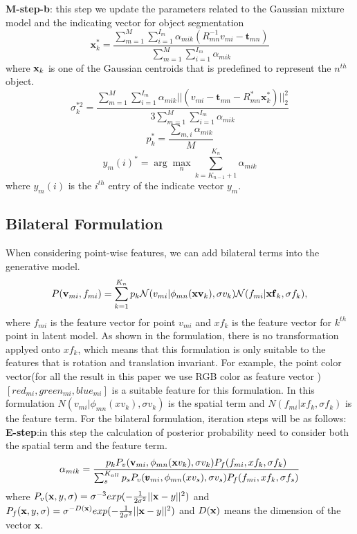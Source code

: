 \textbf{M-step-b}: this step we update the parameters related to the Gaussian mixture model and the indicating vector for object segmentation 
\begin{equation}
\label{equ:updatexk}
\pmb x_k^*=\frac{\sum_{m=1}^M\sum_{i=1}^{I_m}\alpha_{mik}(R_{mn}^{-1}v_{mi}-\pmb t_{mn})}{\sum_{m=1}^M\sum_{i=1}^{I_m}\alpha_{mik}}
\end{equation}
where $\mathbf{x}_k$ is one of the Gaussian centroids that is predefined to represent the $n^{th}$ object. 
\begin{equation}
\label{equ:updatesigma}
\sigma_k^{*2}=\frac{\sum_{m=1}^M\sum_{i=1}^{I_m}\alpha_{mik}||(v_{mi}-\pmb t_{mn}-R_{mn}^*\pmb x_k^*)||_2^2}{3\sum_{m=1}^M\sum_{i=1}^{I_m}\alpha_{mik}}
\end{equation}
\begin{equation}
\label{equ:updatepk}
p_k^*=\frac{\sum_{m,i}\alpha_{mik}}{M}
\end{equation}
\begin{equation}
\label{equ:updatey}
y_{m}(i)^*=\arg \max_n \sum_{k=K_{n-1}+1}^{K_n} \alpha_{mik} 
\end{equation}
where $y_{m}(i)$ is the $i^{th}$ entry of the indicate vector $y_m$.
\subsection{Bilateral Formulation}
When considering point-wise features, we can add bilateral terms into the generative model.
\begin{equation}
P(\mathbf{v}_{mi},f_{mi})=\sum^{K_n}_{k=1}p_k\mathcal{N}(v_{mi}|\phi_{mn}(\mathbf{xv}_k),\sigma v_k)\mathcal{N}(f_{mi}|\mathbf{xf}_k,\sigma f_k),
\end{equation}
where $f_{mi}$ is the feature vector for point $v_{mi}$ and $xf_k$ is the feature vector for $k^{th}$ point in latent model. As shown in the formulation, there is no transformation applyed onto $xf_k$, which means that this formulation is only suitable to the features that is rotation and translation invariant. For example, the point color vector(for all the result in this paper we use RGB color as feature vector ) $[red_{mi},green_{mi},blue_{mi}]$ is a suitable feature for this formulation. In this formulation $N(v_{mi}|\phi_{mn}(xv_k),\sigma v_k)$ is the spatial term and $N(f_{mi}|xf_k,\sigma f_k)$ is the feature term.
For the bilateral formulation, iteration steps will be as follows:\\
\textbf{E-step}:in this step the calculation of posterior probability need to consider both the spatial term and the feature term.
\begin{equation}
\label{equ:bestep}
\alpha_{mik}=\frac{p_kP_v( \mathbf{v}_{mi},\phi_{mn}(\mathbf{x}v_k),\sigma v_k)P_f(f_{mi},xf_k,\sigma f_k)}{\sum_s^{K_{all}}p_sP_v( \pmb v_{mi},\phi_{mn}(xv_s),\sigma v_s)P_f(f_{mi},xf_k,\sigma f_s)}
\end{equation}
where $P_v(\mathbf{x},y,\sigma)=\sigma^{-3}exp(-\frac{1}{2\sigma^2}||\mathbf{x}-y||^2)$ and $P_f(\mathbf{x},y,\sigma)=\sigma^{-D(\mathbf{x})}exp(-\frac{1}{2\sigma^2}||\mathbf{x}-y||^2)$ and $D(\mathbf{x})$ means the dimension of the vector $\pmb x$. 




